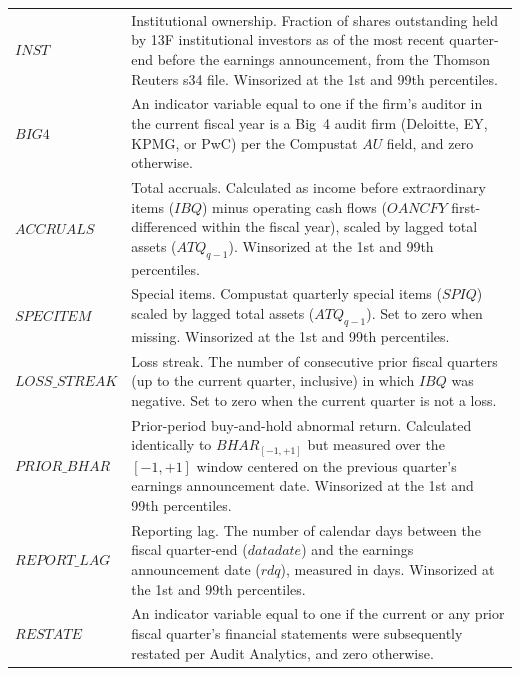 \documentclass[english,12pt]{article}
\begin{document}
\begin{longtable}{p{3.8cm}p{12cm}}
$INST$ & Institutional ownership. Fraction of shares outstanding held by 13F institutional investors as of the most recent quarter-end before the earnings announcement, from the Thomson Reuters s34 file. Winsorized at the 1st and 99th percentiles. \\

$BIG4$ & An indicator variable equal to one if the firm's auditor in the current fiscal year is a Big~4 audit firm (Deloitte, EY, KPMG, or PwC) per the Compustat $AU$ field, and zero otherwise. \\

$ACCRUALS$ & Total accruals. Calculated as income before extraordinary items ($IBQ$) minus operating cash flows ($OANCFY$ first-differenced within the fiscal year), scaled by lagged total assets ($ATQ_{q-1}$). Winsorized at the 1st and 99th percentiles. \\

$SPECITEM$ & Special items. Compustat quarterly special items ($SPIQ$) scaled by lagged total assets ($ATQ_{q-1}$). Set to zero when missing. Winsorized at the 1st and 99th percentiles. \\

$LOSS\_STREAK$ & Loss streak. The number of consecutive prior fiscal quarters (up to the current quarter, inclusive) in which $IBQ$ was negative. Set to zero when the current quarter is not a loss. \\

$PRIOR\_BHAR$ & Prior-period buy-and-hold abnormal return. Calculated identically to $BHAR_{[-1,+1]}$ but measured over the $[-1,+1]$ window centered on the previous quarter's earnings announcement date. Winsorized at the 1st and 99th percentiles. \\

$REPORT\_LAG$ & Reporting lag. The number of calendar days between the fiscal quarter-end ($datadate$) and the earnings announcement date ($rdq$), measured in days. Winsorized at the 1st and 99th percentiles. \\

$RESTATE$ & An indicator variable equal to one if the current or any prior fiscal quarter's financial statements were subsequently restated per Audit Analytics, and zero otherwise. \\

\end{longtable}
\endgroup


\end{document}

